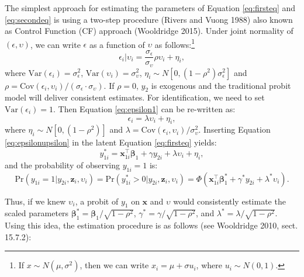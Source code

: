 The simplest approach for estimating the parameters of Equation \eqref{eq:firsteq} and \eqref{eq:secondeq} is using a two-step procedure (Rivers and Vuong 1988) also known as Control Function (CF) approach (Wooldridge 2015). Under joint normality of \((\epsilon, \upsilon)\), we can write \(\epsilon\) as a function of \(\upsilon\) as follows:\footnote{If \(x\sim N(\mu, \sigma^2)\), then we can write \(x_i = \mu + \sigma u_i\), where \(u_i \sim N(0, 1)\).}
\begin{equation}
  \epsilon_i|\upsilon_i = \frac{\sigma_{\epsilon}}{\sigma_{\upsilon}}\rho\upsilon_i + \eta_i,
  \label{eq:epsilon1}
\end{equation}
where \(\textrm{Var}(\epsilon_i) = \sigma_{\epsilon}^2\), \(\textrm{Var}(\upsilon_i) = \sigma_{\upsilon}^2\), \(\eta_i \sim N\left[0, (1 - \rho^2)\sigma_{\epsilon}^2\right]\) and \(\rho = \textrm{Cov}(\epsilon_i, \upsilon_i) / (\sigma_{\epsilon}\cdot \sigma_{\upsilon})\). If \(\rho = 0\), \(y_{2}\) is exogenous and the traditional probit model will deliver consistent estimates. For identification, we need to set \(\textrm{Var}(\epsilon_i) = 1\). Then Equation \eqref{eq:epsilon1} can be re-written as:
\begin{equation}
 \epsilon_i = \lambda\upsilon_i + \eta_i,
 \label{eq:epsilonupsilon}
\end{equation}
where \(\eta_i \sim N\left[0, (1 - \rho^2)\right]\) and \(\lambda = \textrm{Cov}(\epsilon_i, \upsilon_i) / \sigma_{\upsilon}^2\). Inserting Equation \eqref{eq:epsilonupsilon} in the latent Equation \eqref{eq:firsteq} yields:
\begin{equation*}
    y_{1i}^*  =   \mathbf x_{1i}^\top\boldsymbol \beta_{1} +  \gamma y_{2i} + \lambda\upsilon_i + \eta_i, 
\end{equation*}
and the probability of observing \(y_{1i} = 1\) is:
\begin{equation}
        \textrm{Pr}(y_{1i} =1|  y_{2i}, \mathbf z_i, \upsilon_i)  = \textrm{Pr}(y_{1i}^* > 0 | y_{2i}, \mathbf z_i, \upsilon_i) = \Phi\left(\mathbf x_{1i}^\top\boldsymbol \beta_{1}^* + \gamma^* y_{2i}+ \lambda^*\upsilon_i\right).
        \label{eq:pi}
\end{equation}

Thus, if we knew \(\upsilon_i\), a probit of \(y_1\) on \(\mathbf x\) and \(\upsilon\) would consistently estimate the scaled parameters \(\boldsymbol \beta^*_1 = \boldsymbol \beta_1/\sqrt{1 - \rho^2}\), \(\gamma^* = \gamma/\sqrt{1 - \rho^2}\), and \(\lambda ^* = \lambda/\sqrt{1 - \rho^2}\). Using this idea, the estimation procedure is as follows (see Wooldridge 2010, sect. 15.7.2):

